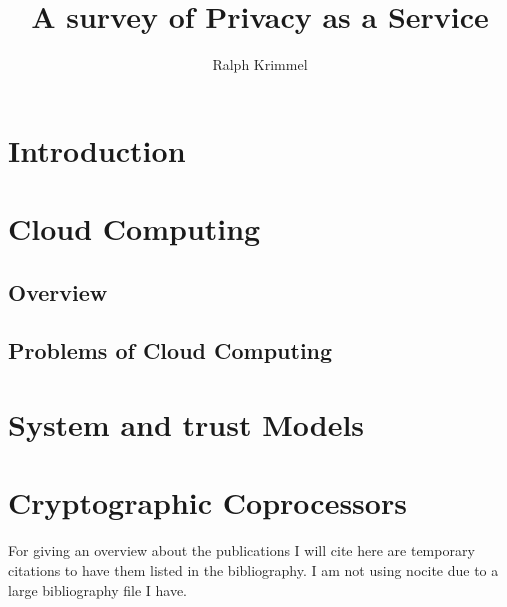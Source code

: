 \documentclass[12pt,a4paper]{article}
\author{Ralph Krimmel}
\title{A survey of Privacy as a Service}
\begin{document}
	

	\tableofcontents

	\newpage
	\section{Introduction}

	\section{Cloud Computing}
		\subsection{Overview}

		\subsection{Problems of Cloud Computing}
	
	\section{System and trust Models}

	\section{Cryptographic Coprocessors}
		


	For giving an overview about the publications I will cite here are temporary citations to have them listed in the bibliography. I am not using nocite due to a large bibliography file I have. \\
	\cite{itani2009}
	\cite{Tygar91dyad:a}
	\cite{white1990abyss}
	\cite{Tygar91dyad:a}
	\cite{Yee94usingsecure}
	
	
	
\end{document}
